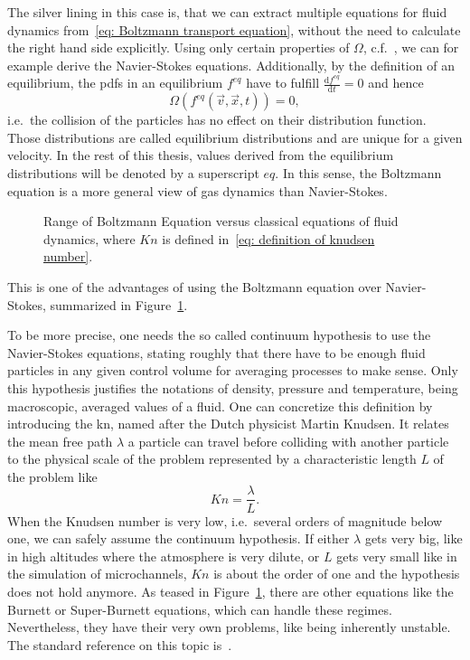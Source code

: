 The silver lining in this case is, that we can extract multiple equations for fluid dynamics from~\eqref{eq: Boltzmann transport equation}, without the need to calculate the right hand side explicitly.
Using only certain properties of $\Omega$, c.f.~\cite[Pages 26 ff.]{harris2004introduction}, we can for example derive the Navier-Stokes equations.
Additionally, by the definition of an equilibrium, the \glspl{pdf} in an equilibrium $f^{eq}$ have to fulfill $\frac{\text{d}f^{eq}}{\text{d}t}=0$ and hence
\begin{equation}
  \Omega(f^{eq}(\vec{v},\vec{x},t)) = 0,
\end{equation}
i.e.\ the collision of the particles has no effect on their distribution function.
Those distributions are called equilibrium distributions and are unique for a given velocity.
In the rest of this thesis, values derived from the equilibrium distributions will be denoted by a superscript $eq$.
In this sense, the Boltzmann equation is a more general view of gas dynamics than Navier-Stokes.
\begin{figure}
\centering

\caption{Range of Boltzmann Equation versus classical equations of fluid dynamics, where $Kn$ is defined in~\eqref{eq: definition of knudsen number}.}
\label{fig: boltzmann vs navier stokes}
\end{figure}

This is one of the advantages of using the Boltzmann equation over Navier-Stokes, summarized in Figure~\ref{fig: boltzmann vs navier stokes}.

To be more precise, one needs the so called continuum hypothesis to use the Navier-Stokes equations, stating roughly that there have to be enough fluid particles in any given control volume for averaging processes to make sense.
Only this hypothesis justifies the notations of density, pressure and temperature, being macroscopic, averaged values of a fluid.
One can concretize this definition by introducing the \gls{kn}, named after the Dutch physicist Martin Knudsen.
It relates the mean free path $\lambda$ a particle can travel before colliding with another particle to the physical scale of the problem represented by a characteristic length $L$ of the problem like
\begin{equation}
  \label{eq: definition of knudsen number}
  Kn=\frac{\lambda}{L}.
\end{equation}
When the Knudsen number is very low, i.e.\ several orders of magnitude below one, we can safely assume the continuum hypothesis.
If either $\lambda$ gets very big, like in high altitudes where the atmosphere is very dilute, or $L$ gets very small like in the simulation of microchannels, $Kn$ is about the order of one and the hypothesis does not hold anymore.
As teased in Figure~\ref{fig: boltzmann vs navier stokes}, there are other equations like the Burnett or Super-Burnett equations, which can handle these regimes.
Nevertheless, they have their very own problems, like being inherently unstable.
The standard reference on this topic is~\cite{agarwal2001beyond}.
